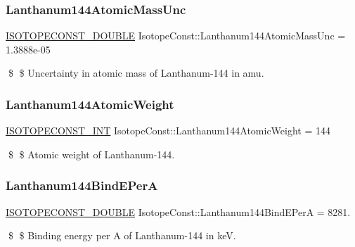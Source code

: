 \subsubsection{\texorpdfstring{Lanthanum144\+Atomic\+Mass\+Unc}{Lanthanum144AtomicMassUnc}}
{\footnotesize\ttfamily \mbox{\hyperlink{group___isotope_const-_macros_ga8f45a7272ce02c0b4c65c44636ed719a}{I\+S\+O\+T\+O\+P\+E\+C\+O\+N\+S\+T\+\_\+\+D\+O\+U\+B\+LE}} Isotope\+Const\+::\+Lanthanum144\+Atomic\+Mass\+Unc = 1.\+3888e-\/05}

\$ \$ Uncertainty in atomic mass of Lanthanum-\/144 in amu. \mbox{\label{group___isotope_const-_lanthanum-_la144_gaa26d27d4364cf0fd94e4cb5f34285b35}} 
\subsubsection{\texorpdfstring{Lanthanum144\+Atomic\+Weight}{Lanthanum144AtomicWeight}}
{\footnotesize\ttfamily \mbox{\hyperlink{group___isotope_const-_macros_ga5f18360b3e99483a35c32d789e62621c}{I\+S\+O\+T\+O\+P\+E\+C\+O\+N\+S\+T\+\_\+\+I\+NT}} Isotope\+Const\+::\+Lanthanum144\+Atomic\+Weight = 144}

\$ \$ Atomic weight of Lanthanum-\/144. \mbox{\label{group___isotope_const-_lanthanum-_la144_ga48388dc15623b4d1b475817ddaafe76b}} 
\subsubsection{\texorpdfstring{Lanthanum144\+Bind\+E\+PerA}{Lanthanum144BindEPerA}}
{\footnotesize\ttfamily \mbox{\hyperlink{group___isotope_const-_macros_ga8f45a7272ce02c0b4c65c44636ed719a}{I\+S\+O\+T\+O\+P\+E\+C\+O\+N\+S\+T\+\_\+\+D\+O\+U\+B\+LE}} Isotope\+Const\+::\+Lanthanum144\+Bind\+E\+PerA = 8281.}

\$ \$ Binding energy per A of Lanthanum-\/144 in keV. \mbox{\label{group___isotope_const-_lanthanum-_la144_ga93afcd6272f37ac348a56b97b8c175b6}} 
